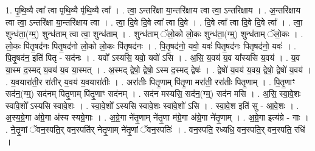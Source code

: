 \documentclass[17pt]{extarticle}
\begin{document}
1. पृ॒थि॒व्यै त्वा᳚ त्वा पृथि॒व्यै पृ॑थि॒व्यै त्वा᳚ । . त्वा॒ ऽन्तरि॑क्षा या॒न्तरि॑क्षाय त्वा त्वा॒ ऽन्तरि॑क्षाय । . अ॒न्तरि॑क्षाय त्वा त्वा॒ ऽन्तरि॑क्षा या॒न्तरि॑क्षाय त्वा । . त्वा॒ दि॒वे दि॒वे त्वा᳚ त्वा दि॒वे । . दि॒वे त्वा᳚ त्वा दि॒वे दि॒वे त्वा᳚ । . त्वा॒ शुन्ध॑ता॒(ग्म्॒) शुन्ध॑ताम् त्वा त्वा॒ शुन्ध॑ताम् । . शुन्ध॑ताम् ॅलो॒को लो॒कः शुन्ध॑ता॒(ग्म्॒) शुन्ध॑ताम् ॅलो॒कः । . लो॒कः पि॑तृ॒षद॑नः पितृ॒षद॑नो लो॒को लो॒कः पि॑तृ॒षद॑नः । . पि॒तृ॒षद॑नो॒ यवो॒ यवः॑ पितृ॒षद॑नः पितृ॒षद॑नो॒ यवः॑ । . पि॒तृ॒षद॑न॒ इति॑ पितृ - सद॑नः । . यवो᳚ ऽस्यसि॒ यवो॒ यवो॑ ऽसि । . अ॒सि॒ य॒वय॑ य॒व या᳚स्यसि य॒वय॑ । . य॒व या॒स्म द॒स्मद् य॒वय॑ य॒व या॒स्मत् । . अ॒स्मद् द्वेषो॒ द्वेषो॒ ऽस्म द॒स्मद् द्वेषः॑ । . द्वेषो॑ य॒वय॑ य॒वय॒ द्वेषो॒ द्वेषो॑ य॒वय॑ । . य॒वयारा॑ती॒र रा॑तीर् य॒वय॑ य॒वयारा॑तीः । . अरा॑तीः पितृ॒णाम् पि॑तृ॒णा मरा॑ती॒ ररा॑तीः पितृ॒णाम् । . पि॒तृ॒णाꣳ सद॑न॒(ग्म्॒) सद॑नम् पितृ॒णाम् पि॑तृ॒णाꣳ सद॑नम् । . सद॑न मस्यसि॒ सद॑न॒(ग्म्॒) सद॑न मसि । . अ॒सि॒ स्वा॒वे॒शः स्वा॑वे॒शो᳚ ऽस्यसि स्वावे॒शः । . स्वा॒वे॒शो᳚ ऽस्यसि स्वावे॒शः स्वा॑वे॒शो॑ ऽसि । . स्वा॒वे॒श इति॑ सु - आ॒वे॒शः । . अ॒स्य॒ग्रे॒गा अ॑ग्रे॒गा अ॑स्य स्यग्रे॒गाः । . अ॒ग्रे॒गा ने॑तृ॒णाम् ने॑तृ॒णा म॑ग्रे॒गा अ॑ग्रे॒गा ने॑तृ॒णाम् । . अ॒ग्रे॒गा इत्य॑ग्रे - गाः । . ने॒तृ॒णां ॅवन॒स्पति॒र् वन॒स्पति॑र् नेतृ॒णाम् ने॑तृ॒णां ॅवन॒स्पतिः॑ । . वन॒स्पति॒ रध्यधि॒ वन॒स्पति॒र् वन॒स्पति॒ रधि॑ । \newline
\end{document}
